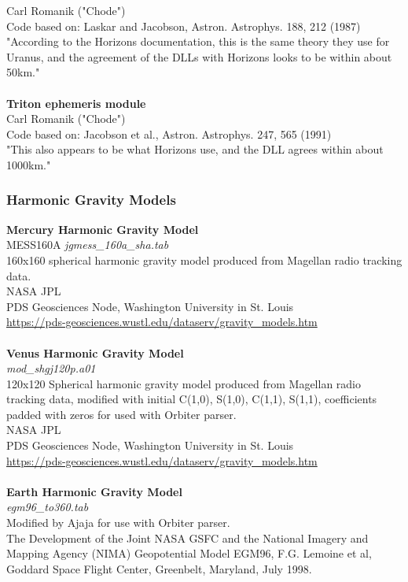 \documentclass[Orbiter User Manual.tex]{subfiles}
\begin{document}
Carl Romanik ("Chode")\\
Code based on: Laskar and Jacobson, Astron. Astrophys. 188, 212 (1987)\\
"According to the Horizons documentation, this is the same theory they use for Uranus, and the agreement of the DLLs with Horizons looks to be within about 50km."\\
\\
\textbf{Triton ephemeris module}\\
Carl Romanik ("Chode")\\
Code based on: Jacobson et al., Astron. Astrophys. 247, 565 (1991)\\
"This also appears to be what Horizons use, and the DLL agrees within about 1000km."
\\
\subsubsection{Harmonic Gravity Models}
\textbf{Mercury Harmonic Gravity Model}\\
MESS160A	\textit{jgmess\_160a\_sha.tab}\\
160x160 spherical harmonic gravity model produced from Magellan radio tracking data.\\
NASA JPL\\
PDS Geosciences Node, Washington University in St. Louis\\
\url{https://pds-geosciences.wustl.edu/dataserv/gravity_models.htm}\\
\\
\textbf{Venus Harmonic Gravity Model}\\
\textit{mod\_shgj120p.a01}\\
120x120 Spherical harmonic gravity model produced from Magellan radio tracking data, modified with initial C(1,0), S(1,0), C(1,1), S(1,1), coefficients padded with zeros for used with Orbiter parser.\\
NASA JPL\\
PDS Geosciences Node, Washington University in St. Louis\\
\url{https://pds-geosciences.wustl.edu/dataserv/gravity_models.htm}\\
\\
\textbf{Earth Harmonic Gravity Model}\\
\textit{egm96\_to360.tab}\\
Modified by Ajaja for use with Orbiter parser.\\
The Development of the Joint NASA GSFC and the National Imagery and Mapping Agency (NIMA) Geopotential Model EGM96, F.G. Lemoine et al, Goddard Space Flight Center, Greenbelt, Maryland, July 1998.\\
\end{document}
